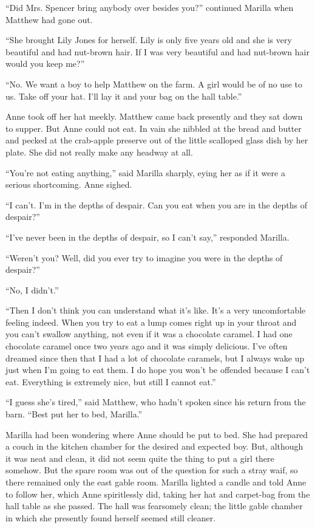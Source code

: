 \documentclass[a4paper]{article}
\begin{document}
``Did Mrs. Spencer bring anybody over besides you?'' continued Marilla when Matthew had gone out.

``She brought Lily Jones for herself. Lily is only five years old and she is very beautiful and had nut-brown hair. If I was very beautiful and had nut-brown hair would you keep me?''

``No. We want a boy to help Matthew on the farm. A girl would be of no use to us. Take off your hat. I'll lay it and your bag on the hall table.''

Anne took off her hat meekly. Matthew came back presently and they sat down to supper. But Anne could not eat. In vain she nibbled at the bread and butter and pecked at the crab-apple preserve out of the little scalloped glass dish by her plate. She did not really make any headway at all.

``You're not eating anything,'' said Marilla sharply, eying her as if it were a serious shortcoming. Anne sighed.

``I can't. I'm in the depths of despair. Can you eat when you are in the depths of despair?''

``I've never been in the depths of despair, so I can't say,'' responded Marilla.

``Weren't you? Well, did you ever try to imagine you were in the depths of despair?''

``No, I didn't.''

``Then I don't think you can understand what it's like. It's a very uncomfortable feeling indeed. When you try to eat a lump comes right up in your throat and you can't swallow anything, not even if it was a chocolate caramel. I had one chocolate caramel once two years ago and it was simply delicious. I've often dreamed since then that I had a lot of chocolate caramels, but I always wake up just when I'm going to eat them. I do hope you won't be offended because I can't eat. Everything is extremely nice, but still I cannot eat.''

``I guess she's tired,'' said Matthew, who hadn't spoken since his return from the barn. ``Best put her to bed, Marilla.''

Marilla had been wondering where Anne should be put to bed. She had prepared a couch in the kitchen chamber for the desired and expected boy. But, although it was neat and clean, it did not seem quite the thing to put a girl there somehow. But the spare room was out of the question for such a stray waif, so there remained only the east gable room. Marilla lighted a candle and told Anne to follow her, which Anne spiritlessly did, taking her hat and carpet-bag from the hall table as she passed. The hall was fearsomely clean; the little gable chamber in which she presently found herself seemed still cleaner.
\end{document}
